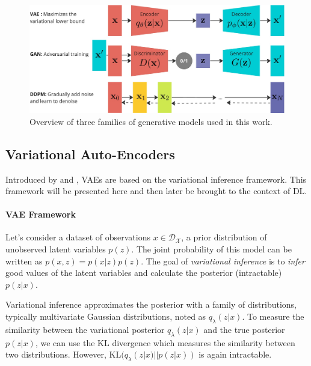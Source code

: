 \begin{figure}[tb]
      \begin{center}
          \includegraphics[width=1.0\linewidth]{images/related/generative_models_overview.jpg}
      \end{center}
      \caption{Overview of three families of generative models used in this work.}
      \label{fig:gen_models}
  \end{figure}


\subsection{Variational Auto-Encoders}

Introduced by  \cite{Kingma2014} and \cite{pmlr-v32-rezende14}, \ac{VAE}s are based on the variational 
inference framework. This framework will be presented here and then later be brought to the context of \ac{DL}.

\paragraph{VAE Framework}
Let's consider a dataset of observations $x \in \mathcal{D_X}$, a prior distribution of unobserved latent 
variables $p(z)$. The joint probability of this model can be written as $p(x,z) = p(x|z)p(z)$. The goal of 
\emph{variational inference} is to \emph{infer} good values of the latent variables and calculate the posterior
(intractable) $p(z|x)$. 



Variational inference approximates the posterior with a family of distributions, typically multivariate 
Gaussian distributions, noted as $q_\lambda(z|x)$. To measure the similarity between the variational 
posterior $q_\lambda(z|x)$ and the true posterior $p(z|x)$, we can use the \ac{KL} divergence which measures
the similarity between two distributions. However, $\mathrm{KL}(q_\lambda(z|x) || p(z|x))$ is again intractable.

